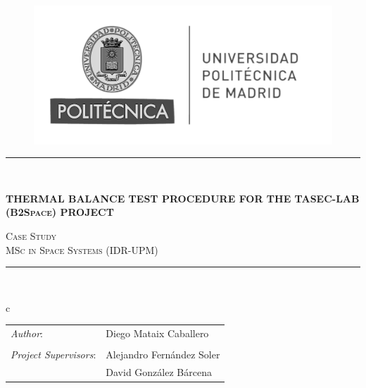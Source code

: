 \documentclass[11pt,a4paper,titlepage]{article}
\begin{document}

\graphicspath{{./Figures/}}
\fancyheadoffset[rh]{0pt}
\fancyfootoffset[rh]{0pt}


\begin{titlepage}
\begin{center}
\vspace*{0in}
\begin{figure}[htb]
\centering
\includegraphics[width = 0.40\linewidth]{z_Figures_portada/upm_logo.png}
\end{figure}

\vspace*{0.2in}
\rule{\linewidth}{0.4mm}\\
\vspace*{0.1in}
\begin{huge}
\textbf{\scshape{THERMAL BALANCE TEST PROCEDURE FOR THE TASEC-LAB (B2Space) PROJECT}} \\
\end{huge}
\vspace*{0.1in}
\begin{large}
\begin{normalsize}
\scshape{Case Study}\\
\scshape{MSc in Space Systems (IDR-UPM)}
\end{normalsize}
\end{large} 
\vspace*{0.2in}
\rule{\linewidth}{0.4mm}\\
\vspace*{0.6in}
\begin{large}
\begin{tabular}{c}
 \\
\begin{tabular}{ l l }
        \textit{Author}: & Diego Mataix Caballero \\
         & \\
        \textit{Project Supervisors}: & Alejandro Fernández Soler\\
        & David González Bárcena 
\end{tabular}


\end{tabular}
\end{large}
\end{center}
\end{titlepage}
\end{document}
